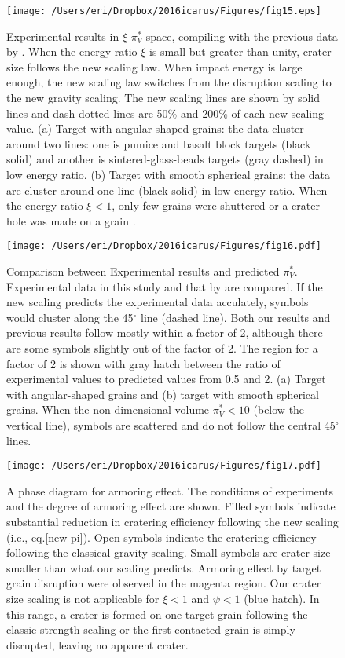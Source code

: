 \documentclass[3p,authoryear]{elsarticle}
\begin{document}
\begin{figure}[htbp]
	\centering
	\texttt{[image: /Users/eri/Dropbox/2016icarus/Figures/fig15.eps]}
	\caption{Experimental results in $\xi$-$\pi_V^*$ space, compiling with the previous data by \citet{schmidt1980, mizutani1983, cintala1999, yamamoto2006, guettler2012, holsapple2014}. When the energy ratio $\xi$ is small but greater than unity, crater size follows the new scaling law. When impact energy is large enough, the new scaling law switches from the disruption scaling to the new gravity scaling. The new scaling lines are shown by solid lines and dash-dotted lines are 50\% and 200\% of each new scaling value. (a) Target with angular-shaped grains: the data cluster around two lines: one is pumice and basalt block targets (black solid) and another is sintered-glass-beads targets (gray dashed) in low energy ratio. (b) Target with smooth spherical grains: the data are cluster around one line (black solid) in low energy ratio. When the energy ratio $\xi<1$, only few grains were shuttered or a crater hole was made on a grain \citep{guettler2012}.}
	\label{xi_vs_newpiV}
	\centering
\end{figure}

\begin{figure}[htbp]
	\centering
	\texttt{[image: /Users/eri/Dropbox/2016icarus/Figures/fig16.pdf]}
	\caption{Comparison between Experimental results and predicted $\pi_V^*$. Experimental data in this study and that by \citet{schmidt1980, mizutani1983, cintala1999, yamamoto2006, guettler2012, holsapple2014} are compared. If the new scaling predicts the experimental data acculately, symbols would cluster along the 45$^\circ$ line (dashed line). Both our results and previous results follow mostly within a factor of 2, although there are some symbols slightly out of the factor of 2. The region for a factor of 2 is shown with gray hatch between the ratio of experimental values to predicted values from 0.5 and 2. (a) Target with angular-shaped grains and (b) target with smooth spherical grains. When the non-dimensional volume $\pi_V^*<10$ (below the vertical line), symbols are scattered and do not follow the central 45$^\circ$ lines.}
	\label{check-new-pi}
	\centering
\end{figure}


\begin{figure}
	\centering
	\texttt{[image: /Users/eri/Dropbox/2016icarus/Figures/fig17.pdf]}
	\caption{A phase diagram for armoring effect. The conditions of experiments and the degree of armoring effect are shown. Filled symbols indicate substantial reduction in cratering efficiency following the new scaling (i.e., eq.\eqref{new-pi}). Open symbols indicate the cratering efficiency following the classical gravity scaling. Small symbols are crater size smaller than what our scaling predicts. Armoring effect by target grain disruption were observed in the magenta region. Our crater size scaling is not applicable for $\xi<1$ and $\psi<1$ (blue hatch). In this range, a crater is formed on one target grain following the classic strength scaling or the first contacted grain is simply disrupted, leaving no apparent crater.}
	\label{psi-xi}
	\centering
\end{figure}
\end{document}
